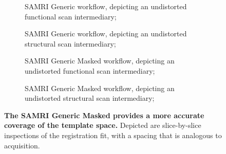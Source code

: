 \begin{figure*}[h!]
    \centering
    \begin{subfigure}[t]{0.48\textwidth}
        \centering
        \setlength{\fboxsep}{0pt}%
        \setlength{\fboxrule}{0.2pt}%
        \caption{
        SAMRI Generic workflow, depicting an undistorted functional scan intermediary;
        \vspace{1em}
        }
        \label{fig:fit_gg}
    \end{subfigure}\hfill
    \begin{subfigure}[t]{0.48\textwidth}
        \centering
        \setlength{\fboxsep}{0pt}%
        \setlength{\fboxrule}{0.2pt}%
        \caption{
        SAMRI Generic workflow, depicting an undistorted structural scan intermediary;
        \vspace{1em}
        }
        \label{fig:fit_gga}
    \end{subfigure}
    \begin{subfigure}[t]{0.48\textwidth}
        \centering
        \setlength{\fboxsep}{0pt}%
        \setlength{\fboxrule}{0.2pt}%
        \caption{
        SAMRI Generic Masked workflow, depicting an undistorted functional scan intermediary;
        }
        \label{fig:fit_ll}
    \end{subfigure}\hfill
    \begin{subfigure}[t]{0.48\textwidth}
        \centering
        \setlength{\fboxsep}{0pt}%
        \setlength{\fboxrule}{0.2pt}%
        \caption{
        SAMRI Generic Masked workflow, depicting an undistorted structural scan intermediary;
        }
        \label{fig:fit_lg}
    \end{subfigure}
    \caption{
    \textbf{The SAMRI Generic Masked provides a more accurate coverage of the template space.}
    Depicted are slice-by-slice inspections of the registration fit, with a spacing that is analogous to acquisition.
    }
    \label{fig:fit}
\end{figure*}

